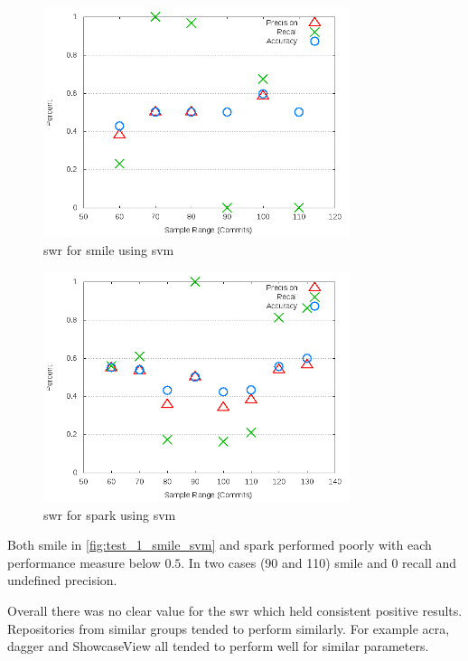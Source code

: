 \begin{figure}[!ht]
    \centering

        \includegraphics[width=0.8\textwidth]{images/svm/test_1/smile_sample_range}
        \caption{\gls{swr} for smile using \gls{svm}}
        \label{fig:test_1_smile_svm}
\end{figure}

\begin{figure}[!ht]
    \centering

        \includegraphics[width=0.8\textwidth]{images/svm/test_1/spark_sample_range}
        \caption{\gls{swr} for spark using \gls{svm}}
        \label{fig:test_1_spark_svm}
\end{figure}

Both smile in \autoref{fig:test_1_smile_svm} and spark performed poorly with each performance measure below $0.5$. In two cases (90 and 110) smile and 0 recall and undefined precision.

Overall there was no clear value for the \gls{swr} which held consistent positive results. Repositories from similar groups tended to perform similarly. For example acra, dagger and ShowcaseView all tended to perform well for similar parameters. 

